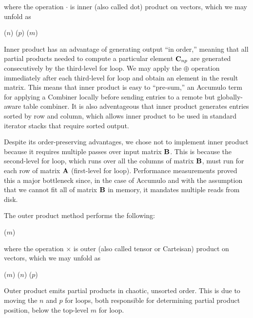 \noindent where the operation $\cdot$ is inner (also called dot) product on vectors, which we may unfold as
\begin{algorithm}[h]
\fore($n$){
\fore($p$){
\fore($m$){
}}}
\end{algorithm}

Inner product has an advantage of generating output ``in order,'' meaning that all partial products needed 
to compute a particular element $\mathbf{C}_{np}$ are generated consecutively by the third-level for loop.
We may apply the $\oplus$ operation immediately after each third-level for loop and obtain an element in the result matrix.
This means that inner product is easy to ``pre-sum,'' an Accumulo term for applying a Combiner
locally before sending entries to a remote but globally-aware table combiner.
It is also adventageous that inner product generates entries sorted by row 
and column, which allows inner product to be used in standard iterator stacks that require sorted output.

Despite its order-preserving advantages, we chose not to implement inner product because 
it requires multiple passes over input matrix $\mathbf{B}$. This is because the second-level for loop, 
which runs over all the columns of matrix $\mathbf{B}$, must run for each row of matrix $\mathbf{A}$ (first-level for loop).
Performance measurements proved this a major bottleneck since, in the case of Accumulo
and with the assumption that we cannot fit all of matrix $\mathbf{B}$ in memory, it mandates multiple reads from disk.

The outer product method performs the following:
\begin{algorithm}
\fore($m$){
}
\end{algorithm}

\noindent where the operation $\times$ is outer (also called tensor or Carteisan) product on vectors, which we may unfold as
\begin{algorithm}
\fore($m$){
\fore($n$){
\fore($p$){
}}}
\end{algorithm}

Outer product emits partial products in chaotic, unsorted order.
This is due to moving the $n$ and $p$ for loops, both responsible for determining partial product position,
below the top-level $m$ for loop.


